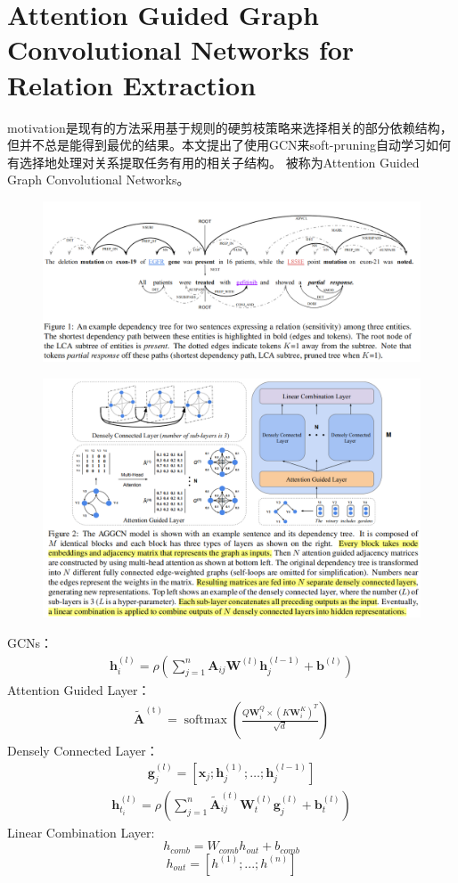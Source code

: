 \documentclass[a4paper,UTF8]{article}
\numberwithin{equation}{section}
\begin{document}
\section{Attention Guided Graph Convolutional Networks for Relation Extraction}
motivation是现有的方法采用基于规则的硬剪枝策略来选择相关的部分依赖结构，但并不总是能得到最优的结果。本文提出了使用GCN来soft-pruning自动学习如何有选择地处理对关系提取任务有用的相关子结构。
被称为Attention Guided Graph Convolutional Networks。
\begin{figure}[H]
	\centering
	\includegraphics[width=\textwidth]{5-22.png}
\end{figure}
\begin{figure}[H]
	\centering
	\includegraphics[width=\textwidth]{5-1.png}
\end{figure}
GCNs：
\begin{align}
	\mathbf{h}_{i}^{(l)}=\rho\left(\sum_{j=1}^{n} \mathbf{A}_{i j} \mathbf{W}^{(l)} \mathbf{h}_{j}^{(l-1)}+\mathbf{b}^{(l)}\right)
	\end{align}
Attention Guided Layer：
\begin{align}
	\tilde{\mathbf{A}}^{(\mathrm{t})}=\operatorname{softmax}\left(\frac{Q \mathbf{W}_{i}^{Q} \times\left(K \mathbf{W}_{i}^{K}\right)^{T}}{\sqrt{d}}\right)
	\end{align}
Densely Connected Layer：
\begin{align}
	\mathbf{g}_{j}^{(l)}=\left[\mathbf{x}_{j} ; \mathbf{h}_{j}^{(1)} ; \ldots ; \mathbf{h}_{j}^{(l-1)}\right]
	\end{align}
	\begin{align}
		\mathbf{h}_{t_{i}}^{(l)}=\rho\left(\sum_{j=1}^{n} \tilde{\mathbf{A}}_{i j}^{(t)} \mathbf{W}_{t}^{(l)} \mathbf{g}_{j}^{(l)}+\mathbf{b}_{t}^{(l)}\right)
		\end{align}
Linear Combination Layer:
$$h_{comb} = W_{comb}h_{out}+b_{comb}$$
$$h_{out} = [h^{(1)};...;h^{(n)}]$$
\end{document}
